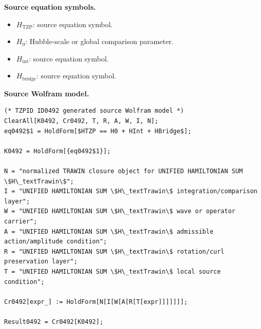 \begin{minipage}[t]{0.49\linewidth}
\begingroup
\small
\raggedright
\textbf{Source equation symbols.}\par
\begin{itemize}[leftmargin=1.35em,itemsep=1pt,topsep=1pt,parsep=0pt]
    \item $H_{\mathrm{TZP}}$: source equation symbol.
    \item $H_0$: Hubble-scale or global comparison parameter.
    \item $H_{\mathrm{int}}$: source equation symbol.
    \item $H_{\mathrm{bridge}}$: source equation symbol.
\end{itemize}
\endgroup
\end{minipage}\hfill
\begin{minipage}[t]{0.47\linewidth}
\begingroup
\scriptsize
\raggedright
\textbf{Source Wolfram model.}\par
\begin{Verbatim}[fontsize=\tiny,breaklines=true,breakanywhere=true]
(* TZPID ID0492 generated source Wolfram model *)
ClearAll[K0492, Cr0492, T, R, A, W, I, N];
eq0492$1 = HoldForm[$HTZP == H0 + HInt + HBridge$];

K0492 = HoldForm[{eq0492$1}];

N = "normalized TRAWIN closure object for UNIFIED HAMILTONIAN SUM \$H\_textTrawin\$";
I = "UNIFIED HAMILTONIAN SUM \$H\_textTrawin\$ integration/comparison layer";
W = "UNIFIED HAMILTONIAN SUM \$H\_textTrawin\$ wave or operator carrier";
A = "UNIFIED HAMILTONIAN SUM \$H\_textTrawin\$ admissible action/amplitude condition";
R = "UNIFIED HAMILTONIAN SUM \$H\_textTrawin\$ rotation/curl preservation layer";
T = "UNIFIED HAMILTONIAN SUM \$H\_textTrawin\$ local source condition";

Cr0492[expr_] := HoldForm[N[I[W[A[R[T[expr]]]]]]];

Result0492 = Cr0492[K0492];
\end{Verbatim}
\endgroup
\end{minipage}

